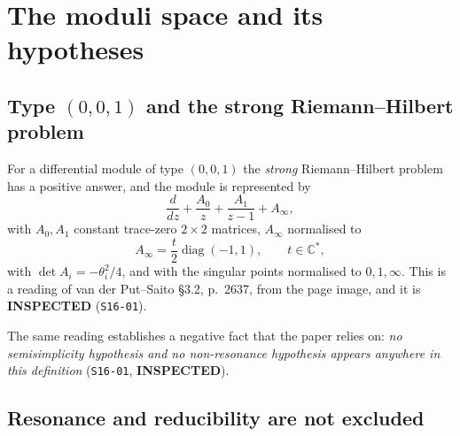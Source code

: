 %

\section{The moduli space and its hypotheses}\label{sec:moduli}

\subsection{Type \texorpdfstring{$(0,0,1)$}{(0,0,1)} and the strong
Riemann--Hilbert problem}\label{ssec:type001}

For a differential module of type $(0,0,1)$ the \emph{strong} Riemann--Hilbert
problem has a positive answer, and the module is represented by
\begin{equation}\label{eq:module}
  \frac{d}{dz}+\frac{A_0}{z}+\frac{A_1}{z-1}+A_\infty ,
\end{equation}
with $A_0,A_1$ constant trace-zero $2\times2$ matrices, $A_\infty$ normalised
to
\begin{equation}\label{eq:Ainf}
  A_\infty=\frac{t}{2}\operatorname{diag}(-1,1),\qquad t\in\mathbb C^{*},
\end{equation}
with $\det A_i=-\theta_i^2/4$, and with the singular points normalised to
$0,1,\infty$. This is a reading of van der Put--Saito \S3.2, p.~2637, from the
page image, and it is \textbf{INSPECTED} (\texttt{S16-01}).

The same reading establishes a negative fact that the paper relies on:
\emph{no semisimplicity hypothesis and no non-resonance hypothesis appears
anywhere in this definition} (\texttt{S16-01}, \textbf{INSPECTED}).

\subsection{Resonance and reducibility are not excluded}\label{ssec:resonance}


